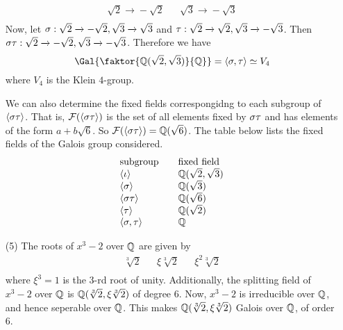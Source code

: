 \begin{example}
\begin{enumerate}
\begin{equation*}
\begin{array}{lcl}
                    \sqrt{2}    \xrightarrow{} -\sqrt{2} && \sqrt{3}
                                                \xrightarrow{} -\sqrt{3} \\
                \end{array}
            \end{equation*}
            Now, let $\sigma:\sqrt{2} \xrightarrow{} -\sqrt{2}, \sqrt{3}
            \xrightarrow{} \sqrt{3}$ and $\tau:\sqrt{2} \xrightarrow{} \sqrt{2},
            \sqrt{3} \xrightarrow{} -\sqrt{3}$. Then $\sigma\tau:\sqrt{2}
            \xrightarrow{} -\sqrt{2}, \sqrt{3} \xrightarrow{} -\sqrt{3}$.
            Therefore we have
            \begin{equation*}
                \Gal{\faktor{\Q(\sqrt{2},\sqrt{3})}{\Q}}=\langle \s,\t \rangle
                \simeq V_4
            \end{equation*}
            where $V_4$ is the Klein $4$-group.

            We can also determine the fixed fields correspongidng to each
            subgroup of  $\langle \sigma \tau \rangle$. That is, $\mathcal{F}(\langle \sigma\tau
            \rangle)$ is the set of all elements fixed by $\sigma\tau$ and has
            elements of the form  $a+b\sqrt{6}$. So $\mathcal{F}(\langle \sigma\tau
            \rangle)=\mathbb{Q}(\sqrt{6})$. The table below lists the fixed fields of
            the Galois group considered.
            \begin{equation*}
                \begin{array}{lcl}
                    \text{subgroup}    &&   \text{fixed field}   \\
                    \langle \iota \rangle  &&   \mathbb{Q}(\sqrt{2},\sqrt{3})   \\
                    \langle \sigma \rangle  &&   \mathbb{Q}(\sqrt{3})   \\
                    \langle \sigma\tau \rangle  &&   \mathbb{Q}(\sqrt{6})   \\
                    \langle \tau \rangle  &&   \mathbb{Q}(\sqrt{2})   \\
                    \langle \sigma,\tau \rangle  &&   \mathbb{Q}   \\
                \end{array}
            \end{equation*}

        \item[(5)] The roots of $x^3-2$ over  $\mathbb{Q}$ are given by
            \begin{align*}
                \sqrt[3]{2} && \xi\sqrt[3]{2}   &&  \xi^2\sqrt[3]{2}    \\
            \end{align*}
            where $\xi^3=1$ is the  $3$-rd root of unity. Additionally, the
            splitting field of  $x^3-2$ over  $\mathbb{Q}$ is  $\mathbb{Q}(\sqrt[3]{2},
            \xi\sqrt[3]{2})$ of degree $6$. Now,  $x^3-2$ is irreducible over
            $\mathbb{Q}$, and hence seperable over  $\mathbb{Q}$. This makes  $\mathbb{Q}(\sqrt[3]{2},
            \xi\sqrt[3]{2})$ Galois over $\mathbb{Q}$, of order  $6$.


\end{enumerate}
\end{example}
